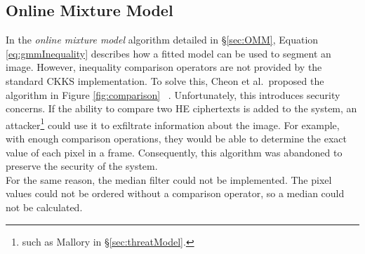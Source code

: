 \subsection{Online Mixture Model}
\indent \indent
In the \textit{online mixture model} algorithm detailed in §\ref{sec:OMM}, Equation \ref{eq:gmmInequality} describes how a fitted model can be used to segment an image. However, inequality comparison operators are not provided by the standard CKKS implementation. To solve this, Cheon et al.\ proposed the algorithm in Figure \ref{fig:comparison} ~\cite{Comparison}. Unfortunately, this introduces security concerns. If the ability to compare two HE ciphertexts is added to the system, an attacker\footnote{such as Mallory in §\ref{sec:threatModel}.} could use it to exfiltrate information about the image. For example, with enough comparison operations, they would be able to determine the exact value of each pixel in a frame. Consequently, this algorithm was abandoned to preserve the security of the system.
\smallskip \\ \indent
For the same reason, the median filter could not be implemented. The pixel values could not be ordered without a comparison operator, so a median could not be calculated.
